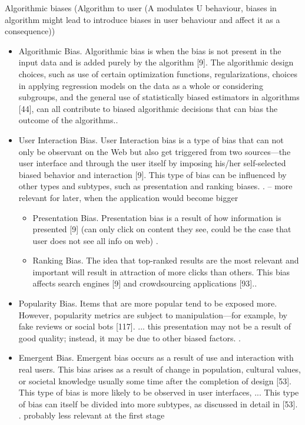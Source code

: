 \documentclass[12pt, a4paper, oneside]{book}   	%
\begin{document}
			Algorithmic biases (Algorithm to user (A modulates U behaviour, biases in algorithm might lead to introduce biases in user behaviour and affect it as a consequence)) \autocite{Mehrabi_2021}
			\begin{itemize}
				\item Algorithmic Bias. Algorithmic bias is when the bias is not present in the input data and is added purely by the algorithm [9]. The algorithmic design choices, such as use of certain optimization functions, regularizations, choices in applying regression models on the data as a whole or considering subgroups, and the general use of statistically biased estimators in algorithms [44], can all contribute to biased algorithmic decisions that can bias the outcome of the algorithms.\autocite{Mehrabi_2021}.
				\item User Interaction Bias. User Interaction bias is a type of bias that can not only be observant on the Web but also get triggered from two sources—the user interface and through the user itself by imposing his/her self-selected biased behavior and interaction [9]. This type of bias can be influenced by other types and subtypes, such as presentation and ranking biases. \autocite{Mehrabi_2021}. -- more relevant for later, when the application would become bigger
				\begin{itemize}
					\item Presentation Bias. Presentation bias is a result of how information is presented [9] (can only click on content they see, could be the case that user does not see all info on web) \autocite{Mehrabi_2021}.
					\item Ranking Bias. The idea that top-ranked results are the most relevant and important will result in attraction of more clicks than others. This bias affects search engines [9] and crowdsourcing applications [93].\autocite{Mehrabi_2021}.
				\end{itemize}
				\item Popularity Bias. Items that are more popular tend to be exposed more. However, popularity metrics are subject to manipulation—for example, by fake reviews or social bots [117]. ... this presentation may not be a result of good quality; instead, it may be due to other biased factors. \autocite{Mehrabi_2021}.
				\item Emergent Bias. Emergent bias occurs as a result of use and interaction with real users. This bias arises as a result of change in population, cultural values, or societal knowledge usually some time after the completion of design [53]. This type of bias is more likely to be observed in user interfaces, ... This type of bias can itself be divided into more subtypes, as discussed in detail in [53]. \autocite{Mehrabi_2021}. probably less relevant at the first stage

\end{itemize}
\end{document}
